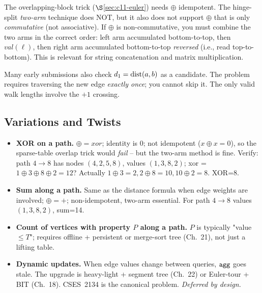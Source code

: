 \begin{warningbox}
The overlapping-block trick (\(\S\)\ref{sec:c11-euler}) needs
\(\oplus\) idempotent.  The hinge-split \emph{two-arm} technique does
NOT, but it also does not support \(\oplus\) that is only
\emph{commutative} (not associative).  If \(\oplus\) is non-commutative,
you must combine the two arms in the correct order: left arm accumulated
bottom-to-top, then \(\mathit{val}(\ell)\), then right arm accumulated
bottom-to-top \emph{reversed} (i.e., read top-to-bottom).  This is
relevant for string concatenation and matrix multiplication.
\end{warningbox}

\begin{warningbox}
Many early submissions also check \(d_1 = \operatorname{dist}(a,b)\) as a candidate.
The problem requires traversing the new edge \emph{exactly once}; you
cannot skip it.  The only valid walk lengths involve the \(+1\) crossing.
\end{warningbox}

\subsection{Variations and Twists}

\begin{itemize}[nosep]
  \item \textbf{XOR on a path.}  \(\oplus = \mathit{xor}\); identity is
        0; not idempotent (\(x \oplus x = 0\)), so the sparse-table
        overlap trick would \emph{fail} -- but the two-arm method is fine.
        Verify: path \(4\to8\) has nodes \((4,2,5,8)\), values
        \((1,3,8,2)\); xor = \(1\oplus3\oplus8\oplus2 = 12\)?  Actually
        \(1\oplus3=2, 2\oplus8=10, 10\oplus2=8\).  XOR=8.  \hfill{}
  \item \textbf{Sum along a path.}  Same as the distance formula when
        edge weights are involved; \(\oplus = +\); non-idempotent, two-arm
        essential.  For path \(4\to8\) values \((1,3,8,2)\), sum=14.  \hfill{}
  \item \textbf{Count of vertices with property \(P\) along a path.}
        \(P\) is typically "value \(\le T\)"; requires offline + persistent
        or merge-sort tree (Ch.~21), not just a lifting table.  \hfill{}
  \item \textbf{Dynamic updates.}  When edge values change between
        queries, \(\texttt{agg}\) goes stale.  The upgrade is
        heavy-light + segment tree (Ch.~22) or Euler-tour + BIT (Ch.~18).
        CSES~2134 is the canonical problem.  \emph{Deferred by design.}
        \hfill{}
\end{itemize}

